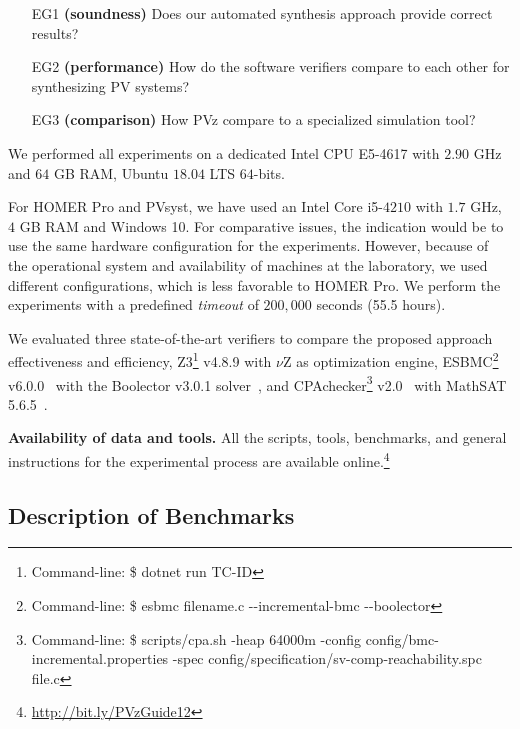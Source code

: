 \documentclass[review]{elsarticle}
\begin{document}
\begin{tcolorbox}
\begin{enumerate}
\item [EG1] \textbf{(soundness)} Does our automated synthesis approach provide correct results?
\item [EG2] \textbf{(performance)} How do the software verifiers compare to each other for synthesizing PV systems?
\item [EG3] \textbf{(comparison)} How PVz compare to a specialized simulation tool?
\end{enumerate}
\end{tcolorbox}

We performed all experiments on a dedicated Intel CPU E5-4617 with $2.90$ GHz and $64$ GB RAM, Ubuntu $18.04$ LTS $64$-bits.

For HOMER Pro and PVsyst, we have used an Intel Core i5-$4210$ with $1.7$ GHz, $4$ GB RAM and Windows 10. For comparative issues, the indication would be to use the same hardware configuration for the experiments. However, because of the operational system and availability of machines at the laboratory, we used different configurations, which is less favorable to HOMER Pro. We perform the experiments with a predefined \textit{timeout} of $200,000$ seconds (55.5 hours).

We evaluated three state-of-the-art verifiers to compare the proposed approach effectiveness and efficiency, Z3\footnote{Command-line: \$ dotnet run TC-ID} v4.8.9 with $\nu$Z as optimization engine, ESBMC\footnote{Command-line: \$ esbmc filename.c -\phantom{}-incremental-bmc -\phantom{}-boolector} v6.0.0~\citep{esbmc2018} with the Boolector v3.0.1 solver~\citep{Brummayer}, and CPAchecker\footnote{Command-line: \$ scripts/cpa.sh -heap 64000m -config config/bmc-incremental.properties -spec config/specification/sv-comp-reachability.spc file.c} v2.0~\citep{Beyer2011} with MathSAT 5.6.5~\citep{mathsat5}. 

\noindent \textbf{Availability of data and tools.} All the scripts, tools, benchmarks, and general instructions for the experimental process are available online.\footnote{\url{http://bit.ly/PVzGuide12}}

\subsection{Description of Benchmarks}
\end{document}
